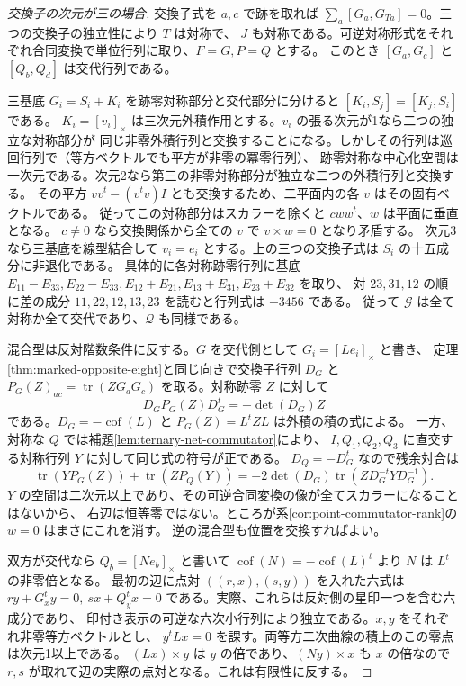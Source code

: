 \begin{proof}[交換子の次元が三の場合]
交換子式を $a,c$ で跡を取れば $\sum_a[G_a,G_{Ta}]=0$。三つの交換子の独立性により $T$ は対称で、
$J$ も対称である。可逆対称形式をそれぞれ合同変換で単位行列に取り、$F=G,P=Q$ とする。
このとき $[G_a,G_c]$ と $[Q_b,Q_d]$ は交代行列である。

三基底 $G_i=S_i+K_i$ を跡零対称部分と交代部分に分けると $[K_i,S_j]=[K_j,S_i]$ である。
$K_i=[v_i]_\times$ は三次元外積作用とする。$v_i$ の張る次元が1なら二つの独立な対称部分が
同じ非零外積行列と交換することになる。しかしその行列は巡回行列で（等方ベクトルでも平方が非零の冪零行列）、
跡零対称な中心化空間は一次元である。次元2なら第三の非零対称部分が独立な二つの外積行列と交換する。
その平方 $vv^t-(v^tv)I$ とも交換するため、二平面内の各 $v$ はその固有ベクトルである。
従ってこの対称部分はスカラーを除くと $cww^t$、$w$ は平面に垂直となる。
$c\ne0$ なら交換関係から全ての $v$ で $v\times w=0$ となり矛盾する。
次元3なら三基底を線型結合して $v_i=e_i$ とする。上の三つの交換子式は $S_i$ の十五成分に非退化である。
具体的に各対称跡零行列に基底
$E_{11}-E_{33},E_{22}-E_{33},E_{12}+E_{21},E_{13}+E_{31},E_{23}+E_{32}$ を取り、
対 $23,31,12$ の順に差の成分 $11,22,12,13,23$ を読むと行列式は $-3456$ である。
従って $\mathcal G$ は全て対称か全て交代であり、$\mathcal Q$ も同様である。

混合型は反対階数条件に反する。$G$ を交代側として $G_i=[Le_i]_\times$ と書き、
定理\ref{thm:marked-opposite-eight}と同じ向きで交換子行列 $D_G$ と
$P_G(Z)_{ac}=\operatorname{tr}(ZG_aG_c)$ を取る。対称跡零 $Z$ に対して
\[
 D_G P_G(Z)D_G^t=-\det(D_G) Z
\]
である。$D_G=-\operatorname{cof}(L)$ と $P_G(Z)=L^t ZL$ は外積の積の式による。
一方、対称な $Q$ では補題\ref{lem:ternary-net-commutator}により、
$I,Q_1,Q_2,Q_3$ に直交する対称行列 $Y$ に対して同じ式の符号が正である。
$D_Q=-D_G^t$ なので残余対合は
\[
 \operatorname{tr}(Y P_G(Z))+\operatorname{tr}(Z P_Q(Y))
 =-2\det(D_G)\operatorname{tr}(Z D_G^{-t}Y D_G^{-1}).
\]
$Y$ の空間は二次元以上であり、その可逆合同変換の像が全てスカラーになることはないから、
右辺は恒等零ではない。ところが系\ref{cor:point-commutator-rank}の $\bar w=0$ はまさにこれを消す。
逆の混合型も位置を交換すればよい。

双方が交代なら $Q_b=[Ne_b]_\times$ と書いて
$\operatorname{cof}(N)=-\operatorname{cof}(L)^t$ より $N$ は $L^t$ の非零倍となる。
最初の辺に点対 $((r,x),(s,y))$ を入れた六式は
$r y+G_x^t y=0,\ s x+Q_y^t x=0$ である。実際、これらは反対側の星印一つを含む六成分であり、
印付き表示の可逆な六次小行列により独立である。$x,y$ をそれぞれ非零等方ベクトルとし、
$y^tLx=0$ を課す。両等方二次曲線の積上のこの零点は次元1以上である。
$(Lx)\times y$ は $y$ の倍であり、$(Ny)\times x$ も $x$ の倍なので
$r,s$ が取れて辺の実際の点対となる。これは有限性に反する。
\end{proof}

